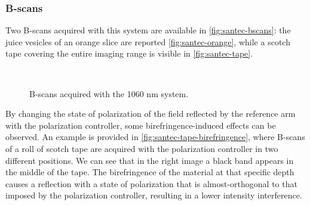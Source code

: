 \subsubsection{B-scans}

Two B-scans acquired with this system are available in \autoref{fig:santec-bscans}: the juice vesicles of an orange slice are reported \autoref{fig:santec-orange}, while a scotch tape covering the entire imaging range is visible in \autoref{fig:santec-tape}. 

\begin{figure}[htb]
	\myfloatalign
	 \quad
	 \\
	\caption{B-scans acquired with the 1060 nm system.}\label{fig:santec-bscans}
\end{figure}

By changing the state of polarization of the field reflected by the reference arm with the polarization controller, some birefringence-induced effects can be observed. An example is provided in \autoref{fig:santec-tape-birefringence}, where B-scans of a roll of scotch tape are acquired with the polarization controller in two different positions. We can see that in the right image a black band appears in the middle of the tape. The birefringence of the material at that specific depth causes a reflection with a state of polarization that is almost-orthogonal to that imposed by the polarization controller, resulting in a lower intensity interference. 

